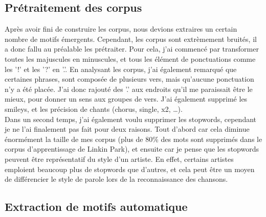 \documentclass[a4paper]{article}
\begin{document}
	\subsection{Prétraitement des corpus}
	
	Après avoir fini de construire les corpus, nous devions extraires un certain nombre de motifs émergents. Cependant, les corpus sont extrèmement bruités, il a donc fallu au préalable les prétraiter. Pour cela, j'ai commencé par transformer toutes les majuscules en minuscules, et tous les élément de ponctuations comme les '!' et les '?' en '.'. En analysant les corpus, j'ai également remarqué que certaines phrases, sont composée de plusieurs vers, mais qu'aucune ponctuation n'y a été placée. J'ai donc rajouté des '.' aux endroits qu'il me paraissait être le mieux, pour donner un sens aux groupes de vers. J'ai également supprimé les smileys, et les précision de chants (chorus, single, x2, \dots).\\
	
	Dans un second temps, j'ai également voulu supprimer les stopwords, cependant je ne l'ai finalement pas fait pour deux raisons. Tout d'abord car cela diminue énormément la taille de mes corpus (plus de 80\% des mots sont supprimés dans le corpus d'apprentissage de Linkin Park), et ensuite car je pense que les stopwords peuvent être représentatif du style d'un artiste. En effet, certains artistes emploient beaucoup plus de stopwords que d'autres, et cela peut être un moyen de différencier le style de parole lors de la reconnaissance des chansons.
	
	\subsection{Extraction de motifs automatique}
	
\end{document}
